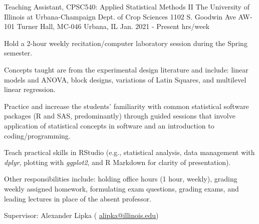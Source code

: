 \begin{cventries}
  \cventry
    {Teaching Assistant, CPSC540: Applied Statistical Methods II} %
    {The University of Illinois at Urbana-Champaign \newline Dept. of Crop Sciences } %
    {1102 S. Goodwin Ave \newline AW-101 Turner Hall, MC-046
    Urbana, IL} %
    {Jan. 2021 - Present  hrs/week} %
    {
      \begin{cvitems} %
        \item {Hold a 2-hour weekly recitation/computer laboratory session during the Spring semester. }
        \item{Concepts taught are from the experimental design literature and include: linear models and ANOVA, block designs, variations of Latin Squares, and multilevel linear regression.}
        \item {Practice and increase the students’ familiarity with common statistical software packages (R and SAS, predominantly) through guided sessions that involve application of statistical concepts in software and an introduction to coding/programming.}
        \item{Teach practical skills in RStudio (e.g., statistical analysis, data management with \textit{dplyr}, plotting with \textit{ggplot2}, and R Markdown for clarity of presentation).}
        \item {Other responsibilities include: holding office hours (1 hour, weekly), grading weekly assigned homework, formulating exam questions, grading exams, and leading lectures in place of the absent professor.}
        \item {Supervisor: Alexander Lipka ( \textcolor{navyblue}{\underline{\href{mailto:alipka@illinois.edu}{alipka@illinois.edu}}})}
      \end{cvitems}
    }





\end{cventries}

